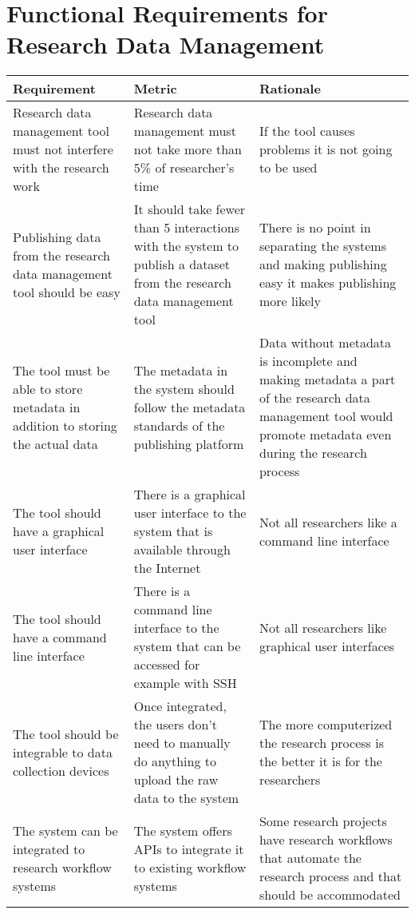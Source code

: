 \pagebreak

\section{Functional Requirements for Research Data Management}

\tabcolsep=0.11cm
\begin{tabularx}{\textwidth}{| >{\raggedright}p{3cm} | >{\raggedright}p{3cm} | X |}
    \hline
    \textbf{Requirement} & \textbf{Metric}& \textbf{Rationale} \\
    \hline
    \rowcolor{Gray}
    Research data management tool must not interfere with the research work    &Research data management must not take more than 5\% of researcher’s time & If the tool causes problems it is not going to be used\\
    \hline
    Publishing data from the research data management tool should be easy&It should take fewer than 5 interactions with the system to publish a dataset from the research data management tool &There is no point in separating the systems and making publishing easy it makes publishing more likely\\
    \hline
    \rowcolor{Gray}
    The tool must be able to store metadata in addition to storing the actual data  &The metadata in the system should follow the metadata standards of the publishing platform&Data without metadata is incomplete and making metadata a part of the research data management tool would promote metadata even during the research process\\
    \hline
    The tool should have a graphical user interface  &There is a graphical user interface to the system that is available through the Internet & Not all researchers like a command line interface\\
    \hline
    \rowcolor{Gray}
    The tool should have a command line interface        &There is a command line interface to the system that can be accessed for example with SSH & Not all researchers like graphical user interfaces\\
    \hline
    The tool should be integrable to data collection devices  & Once integrated, the users don’t need to manually do anything to upload the raw data to the system & The more computerized the research process is the better it is for the researchers\\
    \hline
    \rowcolor{Gray}
    The system can be integrated to research workflow systems   &The system offers APIs to integrate it to existing workflow systems& Some research projects have research workflows that automate the research process and that should be accommodated\\

\end{tabularx}
